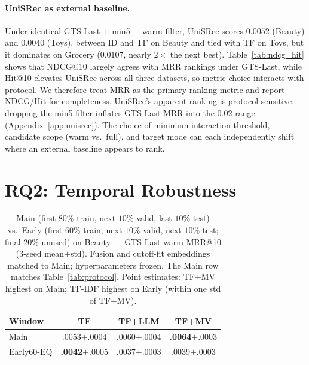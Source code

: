 \documentclass[sigconf,natbib=true,anonymous]{acmart}
\newcommand{\tfidf}{\textsc{TF-IDF}\xspace}
\newcommand{\tfmv}{\textsc{TF+MV}\xspace}
\begin{document}
\paragraph{UniSRec as external baseline.}
Under identical GTS-Last + min5 + warm filter, UniSRec scores $0.0052$ (Beauty) and $0.0040$ (Toys), between ID and TF on Beauty and tied with TF on Toys, but it dominates on Grocery ($0.0107$, nearly $2\times$ the next best).
Table~\ref{tab:ndcg_hit} shows that NDCG@10 largely agrees with MRR rankings under GTS-Last, while Hit@10 elevates UniSRec across all three datasets, so metric choice interacts with protocol.
We therefore treat MRR as the primary ranking metric and report NDCG/Hit for completeness.
UniSRec's apparent ranking is protocol-sensitive: dropping the min5 filter inflates GTS-Last MRR into the 0.02 range (Appendix~\ref{app:unisrec}).
The choice of minimum interaction threshold, candidate scope (warm vs.\ full), and target mode can each independently shift where an external baseline appears to rank.

\section{RQ2: Temporal Robustness}
\label{sec:rq2}

\begin{table}[t]
\centering
\caption{%
Main (first $80\%$ train, next $10\%$ valid, last $10\%$ test) vs.\ Early (first $60\%$ train, next $10\%$ valid, next $10\%$ test; final $20\%$ unused) on Beauty --- GTS-Last warm MRR@10 (3-seed mean$\pm$std).
Fusion and cutoff-fit embeddings matched to Main; hyperparameters frozen.
The Main row matches Table~\ref{tab:protocol}.
Point estimates: \tfmv highest on Main; \tfidf highest on Early (within one std of \tfmv).%
}
\label{tab:early}
\small
\begin{tabular}{@{}lccc@{}}
\toprule
Window & TF & TF+LLM & TF+MV \\
\midrule
Main      & .0053\tiny{$\pm$.0004} & .0060\tiny{$\pm$.0004} & \textbf{.0064}\tiny{$\pm$.0003} \\
Early60-EQ & \textbf{.0042}\tiny{$\pm$.0005} & .0037\tiny{$\pm$.0003} & .0039\tiny{$\pm$.0003} \\
\bottomrule
\end{tabular}
\end{table}
\end{document}
